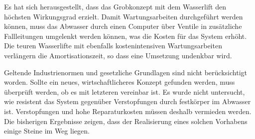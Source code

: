 \documentclass[12pt]{article}
\begin{document}
Es hat sich herausgestellt, dass das Grobkonzept mit dem Wasserlift den höchsten Wirkungsgrad erzielt. Damit Wartungsarbeiten durchgeführt werden können, muss das Abwasser durch einen Computer über Ventile in zusätzliche Fallleitungen umgelenkt werden können, was die Kosten für das System erhöht. Die teuren Wasserlifte mit ebenfalls kostenintensiven Wartungsarbeiten verlängern die Amortisationszeit, so dass eine Umsetzung undenkbar wird. 


Geltende Industrienormen und gesetzliche Grundlagen sind nicht berücksichtigt worden. Sollte ein neues, wirtschaftlicheres Konzept gefunden werden, muss überprüft werden, ob es mit letzteren vereinbar ist. Es wurde nicht untersucht, wie resistent das System gegenüber Verstopfungen durch festkörper im Abwasser ist. Verstopfungen und hohe Reparaturkosten müssen deshalb vermieden werden. Die bisherigen Ergebnisse zeigen, dass der Realisierung eines solchen Vorhabens einige Steine im Weg liegen. 
\end{document}
